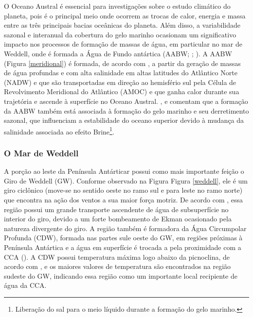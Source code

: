 \documentclass{article}
\begin{document}
O Oceano Austral é essencial para investigações sobre o estudo climático do planeta, pois é o principal meio onde ocorrem as trocas de calor,
energia e massa entre as três principais bacias oceânicas do planeta. Além disso, a variabilidade sazonal e interanual da cobertura do gelo 
marinho ocasionam um significativo impacto nos processos de formação de massas de água, em particular no mar de Weddell, onde é formada a 
Água de Fundo antártica (AABW; \cite{Santini2018}; \cite{Talley2013}). A AABW (\textcolor{bleu_cite}{Figura \ref{meridional}}) é formada, 
de acordo com \cite{Talley2013},  a partir da geração de massas de água profundas e com alta salinidade
em altas latitudes do Atlântico Norte (NADW) e que são transportadas em direção ao hemisfério sul pela Célula de Revolvimento Meridional do Atlântico (AMOC) 
e que ganha calor durante sua trajetória e ascende à superfície no Oceano Austral. \textcite{Santini2018}, \textcite{Haid2013} e \textcite{Tamura2011} comentam que a formação da AABW também está associada
à formação do gelo marinho e seu derretimento sazonal, que influenciam a estabilidade do oceano superior devido à mudança da salinidade associada ao efeito Brine\footnote{Liberação do sal para o meio líquido durante a formação do gelo marinho.}. 
\bigskip

\subsubsection{O Mar de Weddell}
\bigskip

 A porção ao leste da Península Antárticar possui como mais importante feição o Giro de Weddell (GW). Conforme observado na Figura \textcolor{bleu_cite}{Figura \ref{weddell}}, ele é um giro ciclônico 
(move-se no sentido oeste no ramo sul e para leste no ramo norte) que encontra na ação dos ventos a sua maior força motriz. De acordo com 
\textcite{Gordon2001}, essa região possui um grande transporte ascendente de água de subsuperfície no interior do giro, 
devido a um forte bombeamento de Ekman ocasionado pela natureza divergente do giro. A região também é formadora da Água Circumpolar Profunda (CDW),
formada nas partes sule oeste do GW, em regiões próximas à Península Antártica e a água em superfície é trocada a pela proximidade com a CCA (\cite{Vernet2019}). 
A CDW possui temperatura máxima logo abaixo da picnoclina, de acordo com \textcite{Kerr2018}, e os maiores valores de temperatura são encontrados na região sudeste do GW, 
indicando essa região como um importante local recipiente de água da CCA.
\bigskip
\end{document}
